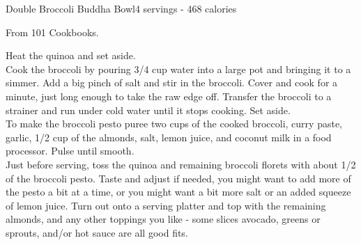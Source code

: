 \begin{recipe}{Double Broccoli Buddha Bowl}{4 servings - 468 calories}{}

\freeform From 101 Cookbooks.


Heat the quinoa and set aside.\\

Cook the broccoli by pouring 3/4 cup water into a large pot and bringing it to a simmer. Add a big pinch of salt and stir in the broccoli. Cover and cook for a minute, just long enough to take the raw edge off. Transfer the broccoli to a strainer and run under cold water until it stops cooking. Set aside.\\

To make the broccoli pesto puree two cups of the cooked broccoli, curry paste, garlic, 1/2 cup of the almonds, salt, lemon juice, and coconut milk in a food processor. Pulse until smooth.\\

Just before serving, toss the quinoa and remaining broccoli florets with about 1/2 of the broccoli pesto. Taste and adjust if needed, you might want to add more of the pesto a bit at a time, or you might want a bit more salt or an added squeeze of lemon juice. Turn out onto a serving platter and top with the remaining almonds, and any other toppings you like - some slices avocado, greens or sprouts, and/or hot sauce are all good fits.

\end{recipe}